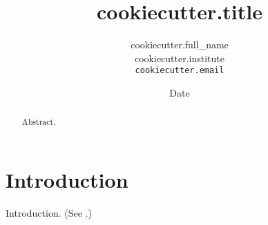 \documentclass[conference]{article}
\author{
    {{ cookiecutter.full_name }}\\
    {{ cookiecutter.institute }}\\
    \texttt{ {{ cookiecutter.email }} }
}
\title{ {{ cookiecutter.title }} }
\date{Date}
\begin{document}
\maketitle

\begin{abstract}
    Abstract.
\end{abstract}

\section{Introduction}

Introduction. (See \cite{whitehead1912principia}.)


\balance

\end{document}
